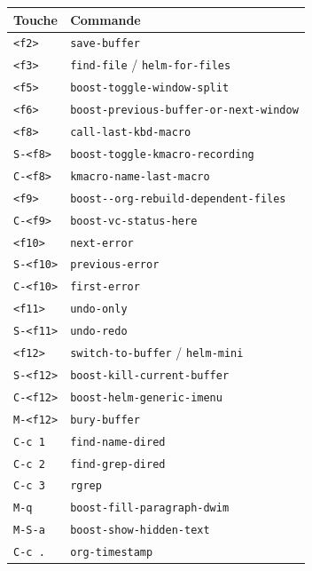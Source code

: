 \documentclass{mcreport}
\begin{document}
\begin{center}
\begin{tabular}{ll}
Touche & Commande\\
\hline
\lstinline|<f2>| & \lstinline|save-buffer|\\
\lstinline|<f3>| & \lstinline|find-file| / \lstinline|helm-for-files|\\
\hline
\lstinline|<f5>| & \lstinline|boost-toggle-window-split|\\
\lstinline|<f6>| & \lstinline|boost-previous-buffer-or-next-window|\\
\hline
\lstinline|<f8>| & \lstinline|call-last-kbd-macro|\\
\lstinline|S-<f8>| & \lstinline|boost-toggle-kmacro-recording|\\
\lstinline|C-<f8>| & \lstinline|kmacro-name-last-macro|\\
\hline
\lstinline|<f9>| & \lstinline|boost--org-rebuild-dependent-files|\\
\lstinline|C-<f9>| & \lstinline|boost-vc-status-here|\\
\hline
\lstinline|<f10>| & \lstinline|next-error|\\
\lstinline|S-<f10>| & \lstinline|previous-error|\\
\lstinline|C-<f10>| & \lstinline|first-error|\\
\hline
\lstinline|<f11>| & \lstinline|undo-only|\\
\lstinline|S-<f11>| & \lstinline|undo-redo|\\
\hline
\lstinline|<f12>| & \lstinline|switch-to-buffer|  / \lstinline|helm-mini|\\
\lstinline|S-<f12>| & \lstinline|boost-kill-current-buffer|\\
\lstinline|C-<f12>| & \lstinline|boost-helm-generic-imenu|\\
\lstinline|M-<f12>| & \lstinline|bury-buffer|\\
\hline
\lstinline|C-c 1| & \lstinline|find-name-dired|\\
\lstinline|C-c 2| & \lstinline|find-grep-dired|\\
\lstinline|C-c 3| & \lstinline|rgrep|\\
\hline
\lstinline|M-q| & \lstinline|boost-fill-paragraph-dwim|\\
\hline
\lstinline|M-S-a| & \lstinline|boost-show-hidden-text|\\
\hline
\lstinline|C-c .| & \lstinline|org-timestamp|\\
\end{tabular}
\end{center}
\end{document}

